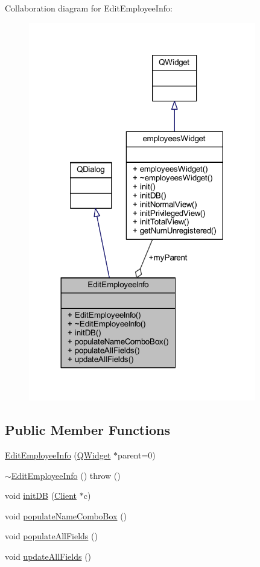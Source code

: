 Collaboration diagram for Edit\+Employee\+Info\+:
\nopagebreak
\begin{figure}[H]
\begin{center}
\leavevmode
\includegraphics[width=281pt]{class_edit_employee_info__coll__graph}
\end{center}
\end{figure}
\subsection*{Public Member Functions}
\begin{DoxyCompactItemize}
\item 
\hyperlink{class_edit_employee_info_add6eedbc583ce181737113ad99085d70}{Edit\+Employee\+Info} (\hyperlink{class_q_widget}{Q\+Widget} $\ast$parent=0)
\item 
\hyperlink{class_edit_employee_info_aec312a7f941efb3fb966c4c46485e61d}{$\sim$\+Edit\+Employee\+Info} ()  throw ()
\item 
void \hyperlink{class_edit_employee_info_a912a17280183793983f543570f69c380}{init\+D\+B} (\hyperlink{class_client}{Client} $\ast$c)
\item 
void \hyperlink{class_edit_employee_info_a7d6061b091f25201bf6f691003c199ef}{populate\+Name\+Combo\+Box} ()
\item 
void \hyperlink{class_edit_employee_info_a02972476ed7e6c7597063e0177d18ee2}{populate\+All\+Fields} ()
\item 
void \hyperlink{class_edit_employee_info_a1cabc3ae692500c1069ade2499cb37a9}{update\+All\+Fields} ()
\end{DoxyCompactItemize}
